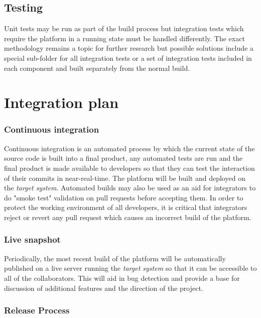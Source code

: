 \documentclass{learnpad}
\begin{document}
\section{Testing}
\label{sec:testing}

Unit tests may be run as part of the build process but integration tests which require the
\learnpad platform in a running state must be handled differently. The exact methodology
remains a topic for further research but possible solutions include a special sub-folder
for all integration tests or a set of integration tests included in each component and built
separately from the normal build.

\chapter{Integration plan}
\label{ch:integration-plan}

\subsection{Continuous integration}
\label{sec:continuous-integration}

Continuous integration is an automated process by which the current state of the source code is
built into a final product, any automated tests are run and the final product is made available
to developers so that they can test the interaction of their commits in near-real-time. The platform
will be built and deployed on the \emph{target system}.
Automated builds may also be used as an aid for integrators to do "smoke test" validation on pull
requests before accepting them. In order to protect the working environment of all developers,
it is critical that integrators reject or revert any pull request which causes an incorrect build
of the platform.

\subsection{Live snapshot}
\label{sec:live-snapshot}

Periodically, the most recent build of the \learnpad platform will be automatically published
on a live server running the \emph{target system} so that it can be accessible to all of the
collaborators. This will aid in bug detection and provide a base for discussion of additional
features and the direction of the project.

\subsection{Release Process}
\label{sec:release-process}
\end{document}

